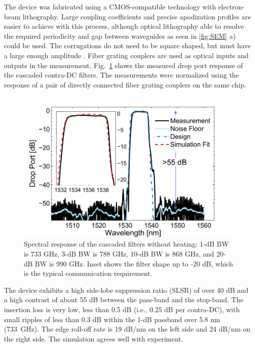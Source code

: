 \documentclass[9pt,twocolumn,twoside]{osajnl}
\begin{document}

The device was fabricated using a CMOS-compatible technology with electron-beam lithography. 
Large coupling coefficients and precise apodization profiles are easier to achieve with this process, although optical lithography able to resolve the required periodicity and gap between waveguides as seen in \ref{fig:SEM} a) could be used. The corrugations do not need to be square shaped, but must have a large enough amplitude
.
Fiber grating couplers \cite{zhong2014focusingFGC} are used as optical inputs and outputs in the measurement. 
Fig.~\ref{fig:passive} shows the measured drop port response of the cascaded contra-DC filters. 
The measurements were normalized using the response of a pair of directly connected fiber grating couplers on the same chip.
\begin{figure}[htbp]
\centering
\includegraphics[width=.99\columnwidth]{data/Passive62}
\caption{ Spectral response of the cascaded filters without heating: 1-dB BW is 733 GHz, 3-dB BW is 788 GHz, 10-dB BW is 868 GHz, and 20-dB BW is 990 GHz. Inset shows the filter shape up to -20 dB, which is the typical communication requirement.}
\label{fig:passive}
\end{figure}

The device exhibits a high side-lobe suppression ratio (SLSR) of over 40 dB and a high contrast of about 55 dB between the pass-band and the stop-band. 
The insertion loss is very low, less than 0.5 dB (i.e., 0.25 dB per contra-DC), with small ripples of less than 0.3 dB within the 1-dB passband over 5.8 nm (733~GHz). 
The edge roll-off rate is 19 dB/nm on the left side and 24 dB/nm on the right side.
The simulation agrees well with experiment.
\end{document}
